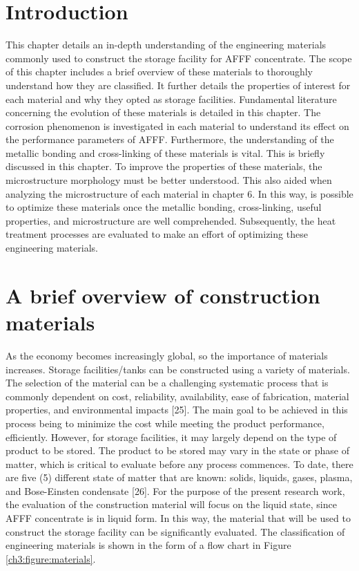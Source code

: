 \documentclass[12pt]{report}
\begin{document}
\section{Introduction}
This chapter details an in-depth understanding of the engineering materials commonly used to construct the storage facility for AFFF concentrate. The scope of this chapter includes a brief overview of these materials to thoroughly understand how they are classified. It further details the properties of interest for each material and why they opted as storage facilities.
Fundamental literature concerning the evolution of these materials is detailed in this chapter. The corrosion phenomenon is investigated in each material to understand its effect on the performance parameters of AFFF. Furthermore, the understanding of the metallic bonding and cross-linking of these materials is vital. This is briefly discussed in this chapter. To improve the properties of these materials, the microstructure morphology must be better understood. This also aided when analyzing the microstructure of each material in chapter 6. In this way, is possible to optimize these materials once the metallic bonding, cross-linking, useful properties, and microstructure are well comprehended. Subsequently, the heat treatment processes are evaluated to make an effort of optimizing these engineering materials.

\section{A brief overview of construction materials}
As the economy becomes increasingly global, so the importance of materials increases. Storage facilities/tanks can be constructed using a variety of materials. The selection of the material can be a challenging systematic process that is commonly dependent on cost, reliability, availability, ease of fabrication, material properties, and environmental impacts [25].  The main goal to be achieved in this process being to minimize the cost while meeting the product performance, efficiently. However, for storage facilities, it may largely depend on the type of product to be stored. The product to be stored may vary in the state or phase of matter, which is critical to evaluate before any process commences. To date, there are five (5) different state of matter that are known: solids, liquids, gases, plasma, and Bose-Einsten condensate [26]. 
For the purpose of the present research work, the evaluation of the construction material will focus on the liquid state, since AFFF concentrate is in liquid form. In this way, the material that will be used to construct the storage facility can be significantly evaluated. The classification of engineering materials is shown in the form of a flow chart in Figure \ref{ch3:figure:materials}.
\end{document}
